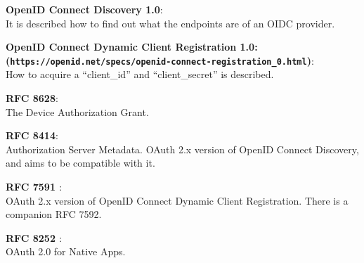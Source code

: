 \documentclass[11pt,a4paper]{ivoa}
\begin{document}
\begin{appendices}
{\bf OpenID Connect Discovery 1.0}:\\
    It is described how to find out what the endpoints are of an OIDC provider.

{\bf OpenID Connect Dynamic Client Registration 1.0: \\
    (\texttt{https://openid.net/specs/openid\--connect\--registration\_0.html})}:\\
    How to acquire a ``client\_id'' and ``client\_secret'' is described.

{\bf RFC 8628\citep{rfc8628}}:\\ 
    The Device  Authorization Grant.

{\bf RFC 8414\citep{rfc8414}}:\\ 
    Authorization Server Metadata. OAuth 2.x version of OpenID Connect Discovery, and aims to be compatible with it.

{\bf RFC 7591 \citep{rfc7591}}:\\ 
    OAuth 2.x version of OpenID Connect Dynamic Client 
    Registration. There is a companion RFC 7592\citep{rfc7592}.

{\bf RFC 8252 \citep{rfc8252}}:\\
    OAuth 2.0 for Native Apps.
    

\end{appendices}


\end{document}

